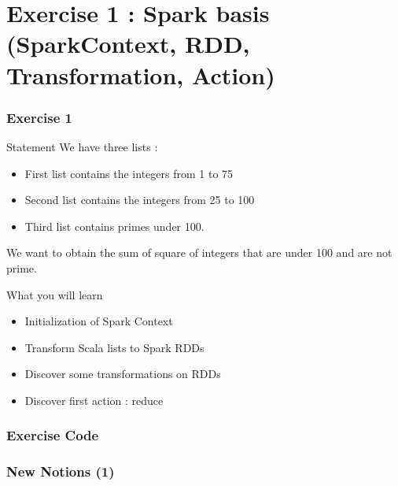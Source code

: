 \documentclass[slidetop,9pt,utf8]{beamer}
\begin{document}
\begin{CJK}{UTF8}{gbsn}
\begin{frame}
  

\end{frame}

\section{Exercise 1 : Spark basis (SparkContext, RDD, Transformation, Action)}

\begin{frame}
  \frametitle{Exercise 1}

  \begin{block}{Statement}
    We have three lists : 
    \begin{itemize}
      \item First list contains the integers from 1 to 75
      \item Second list contains the integers from 25 to 100
      \item Third list contains primes under 100. 
    \end{itemize}
    We want to obtain the sum of square of integers that are under 100 and are not prime.
  \end{block}

  \begin{block}{What you will learn}
    \begin{itemize}
      \item Initialization of Spark Context
      \item Transform Scala lists to Spark RDDs
      \item Discover some transformations on RDDs
      \item Discover first action : reduce
    \end{itemize}
  \end{block}

\end{frame}

\begin{frame}
  \frametitle{Exercise Code}

  

\end{frame}

\begin{frame}[fragile]
  \frametitle{New Notions (1)}


\end{frame}
\end{CJK}
\end{document}
